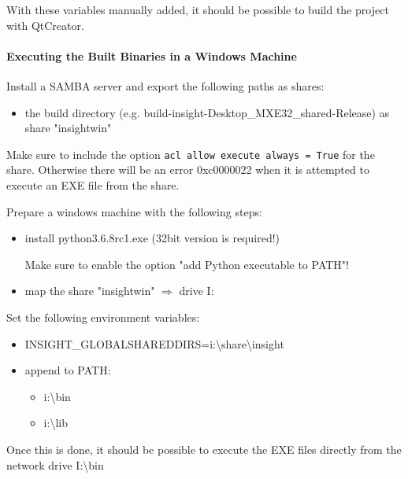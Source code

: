 With these variables manually added, it should be possible to build the project with QtCreator.

\paragraph{Executing the Built Binaries in a Windows Machine}

Install a SAMBA server and export the following paths as shares:
\begin{itemize}
\item the build directory (e.g. build-insight-Desktop\_MXE32\_shared-Release) as share "insightwin"
\end{itemize}
Make sure to include the option \texttt{acl allow execute always = True} for the share.
Otherwise there will be an error 0xc0000022 when it is attempted to execute an EXE file from the share.\warningsymbol

Prepare a windows machine with the following steps:
\begin{itemize}
\item install python3.6.8rc1.exe (32bit version is required!)

Make sure to enable the option "add Python executable to PATH"! \warningsymbol

\item map the share "insightwin" $\Rightarrow$ drive I:
\end{itemize}

Set the following environment variables:
\begin{itemize}
\item INSIGHT\_GLOBALSHAREDDIRS=i:\textbackslash{}share\textbackslash{}insight
\item append to PATH: 
\begin{itemize}
\item i:\textbackslash{}bin
\item i:\textbackslash{}lib
\end{itemize}
\end{itemize}



Once this is done, it should be possible to execute the EXE files directly from the network drive I:\textbackslash{}bin



